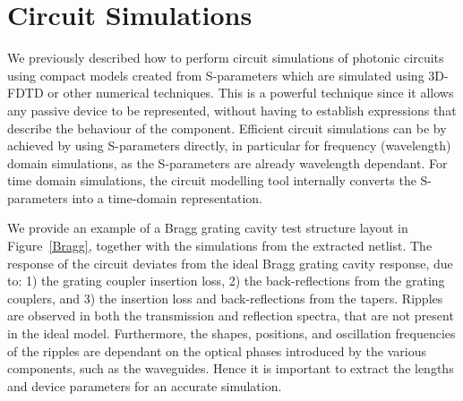 \documentclass[journal]{spie}
\begin{document}
\section{Circuit Simulations}
\label{sec:circuitsim}
We previously described how to perform circuit simulations of photonic circuits using compact models created from S-parameters which are simulated using 3D-FDTD or other numerical techniques\cite{chrostowski2014design, chrostowski2015silicon}.  This is a powerful technique since it allows any passive device to be represented, without having to establish expressions that describe the behaviour of the component.  Efficient circuit simulations can be by achieved by using S-parameters directly, in particular for frequency (wavelength) domain simulations, as the S-parameters are already wavelength dependant.  For time domain simulations, the circuit modelling tool internally converts the S-parameters into a time-domain representation.  

We provide an example of a Bragg grating cavity test structure layout in Figure~\ref{Bragg}, together with the simulations from the extracted netlist.  The response of the circuit deviates from the ideal Bragg grating cavity response, due to: 1) the grating coupler insertion loss, 2) the back-reflections from the grating couplers, and 3) the insertion loss and back-reflections from the tapers.  Ripples are observed in both the transmission and reflection spectra, that are not present in the ideal model.  Furthermore, the shapes,  positions, and oscillation frequencies of the ripples are dependant on the optical phases introduced by the various components, such as the waveguides.  Hence it is important to extract the lengths and device parameters for an accurate simulation.
\end{document}
